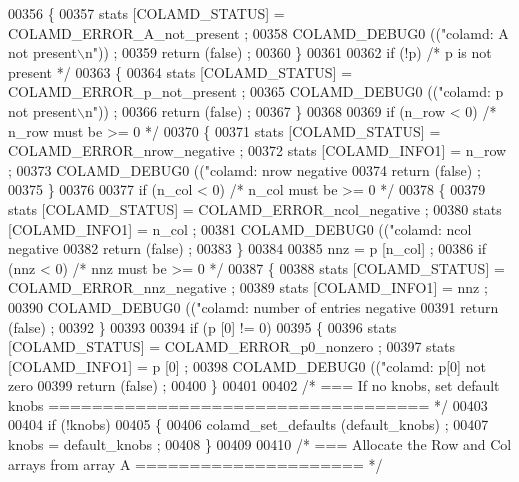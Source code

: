 \begin{DoxyCode}
{{00356   \{
00357     stats [COLAMD\_STATUS] = COLAMD\_ERROR\_A\_not\_present ;
00358     COLAMD\_DEBUG0 ((\textcolor{stringliteral}{"colamd: A not present\(\backslash\)n"})) ;
00359     \textcolor{keywordflow}{return} (\textcolor{keyword}{false}) ;
00360   \}
00361   
00362   \textcolor{keywordflow}{if} (!p)   \textcolor{comment}{/* p is not present */}
00363   \{
00364     stats [COLAMD\_STATUS] = COLAMD\_ERROR\_p\_not\_present ;
00365     COLAMD\_DEBUG0 ((\textcolor{stringliteral}{"colamd: p not present\(\backslash\)n"})) ;
00366     \textcolor{keywordflow}{return} (\textcolor{keyword}{false}) ;
00367   \}
00368   
00369   \textcolor{keywordflow}{if} (n\_row < 0)  \textcolor{comment}{/* n\_row must be >= 0 */}
00370   \{
00371     stats [COLAMD\_STATUS] = COLAMD\_ERROR\_nrow\_negative ;
00372     stats [COLAMD\_INFO1] = n\_row ;
00373     COLAMD\_DEBUG0 ((\textcolor{stringliteral}{"colamd: nrow negative %
00374     \textcolor{keywordflow}{return} (\textcolor{keyword}{false}) ;
00375   \}
00376   
00377   \textcolor{keywordflow}{if} (n\_col < 0)  \textcolor{comment}{/* n\_col must be >= 0 */}
00378   \{
00379     stats [COLAMD\_STATUS] = COLAMD\_ERROR\_ncol\_negative ;
00380     stats [COLAMD\_INFO1] = n\_col ;
00381     COLAMD\_DEBUG0 ((\textcolor{stringliteral}{"colamd: ncol negative %
00382     \textcolor{keywordflow}{return} (\textcolor{keyword}{false}) ;
00383   \}
00384   
00385   nnz = p [n\_col] ;
00386   \textcolor{keywordflow}{if} (nnz < 0)  \textcolor{comment}{/* nnz must be >= 0 */}
00387   \{
00388     stats [COLAMD\_STATUS] = COLAMD\_ERROR\_nnz\_negative ;
00389     stats [COLAMD\_INFO1] = nnz ;
00390     COLAMD\_DEBUG0 ((\textcolor{stringliteral}{"colamd: number of entries negative %
00391     \textcolor{keywordflow}{return} (\textcolor{keyword}{false}) ;
00392   \}
00393   
00394   \textcolor{keywordflow}{if} (p [0] != 0)
00395   \{
00396     stats [COLAMD\_STATUS] = COLAMD\_ERROR\_p0\_nonzero ;
00397     stats [COLAMD\_INFO1] = p [0] ;
00398     COLAMD\_DEBUG0 ((\textcolor{stringliteral}{"colamd: p[0] not zero %
00399     \textcolor{keywordflow}{return} (\textcolor{keyword}{false}) ;
00400   \}
00401   
00402   \textcolor{comment}{/* === If no knobs, set default knobs =================================== */}
00403   
00404   \textcolor{keywordflow}{if} (!knobs)
00405   \{
00406     colamd\_set\_defaults (default\_knobs) ;
00407     knobs = default\_knobs ;
00408   \}
00409   
00410   \textcolor{comment}{/* === Allocate the Row and Col arrays from array A ===================== */}
}}}}}}
\end{DoxyCode}
